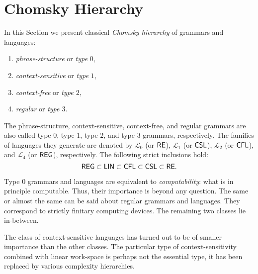 \section{Chomsky Hierarchy}
\label{section:chomsky-hierarchy}

In this Section we present classical \emph{Chomsky hierarchy} of grammars and languages:

\begin{enumerate}
\item {}\emph{phrase-structure} or \emph{type $0$},
\item {}\emph{context-sensitive} or \emph{type $1$},
\item {}\emph{context-free} or \emph{type $2$},
\item {}\emph{regular} or \emph{type $3$}.
\end{enumerate}

The phrase-structure, context-sensitive, context-free, and regular grammars are also called type $0$, type $1$, type $2$, and type $3$ grammars, respectively. The families of languages they generate are denoted by 
$\mathcal{L}_0$ (or \index{$\RE$}$\RE$),
$\mathcal{L}_1$ (or \index{$\CSL$}$\CSL$), 
$\mathcal{L}_2$ (or \index{$\CFL$}$\CFL$), and 
$\mathcal{L}_4$ (or \index{$\Reg$}$\Reg$), respectively.
The following strict inclusions hold:
$$\textup{\sf REG} \subset \textup{\sf LIN} \subset \textup{\sf CFL} \subset \textup{\sf CSL} \subset \textup{\sf RE}.$$

Type $0$ grammars and languages are equivalent to \emph{computability}: what is in principle computable. Thus, their importance is beyond any question. The same or almost the same can be said about regular grammars and languages. They correspond to strictly finitary computing devices. The remaining two classes lie in-between.

The class of context-sensitive languages has turned out to be of smaller importance than the other classes. The particular type of context-sensitivity combined with linear work-space is perhaps not the essential type, it has been replaced by various complexity hierarchies.

